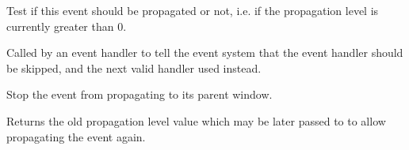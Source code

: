 \label{wxeventshouldpropagate}


Test if this event should be propagated or not, i.e. if the propagation level
is currently greater than $0$.

\label{wxeventskip}


Called by an event handler to tell the event system that the
event handler should be skipped, and the next valid handler used
instead.

\label{wxeventstoppropagation}


Stop the event from propagating to its parent window.

Returns the old propagation level value which may be later passed to 
 to allow propagating the
event again.

